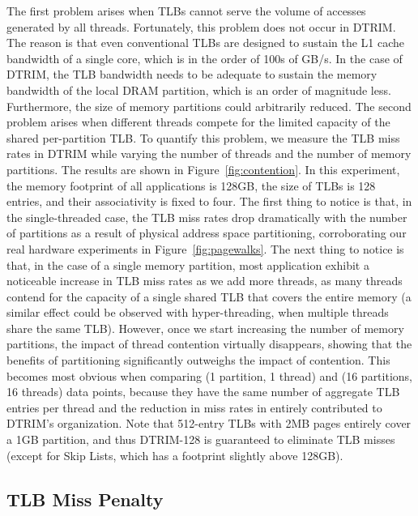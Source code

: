 The first problem arises when TLBs cannot serve the volume of accesses generated by all threads. Fortunately, this problem does not occur in DTRIM. The reason is that even conventional TLBs are designed to sustain the L1 cache bandwidth of a single core, which is in the order of 100s of GB/s. In the case of DTRIM, the TLB bandwidth needs to be adequate to sustain the memory bandwidth of the local DRAM partition, which is an order of magnitude less. Furthermore, the size of memory partitions could arbitrarily reduced. The second problem arises when different threads compete for the limited capacity of the shared per-partition TLB. To quantify this problem, we measure the TLB miss rates in DTRIM while varying the number of threads and the number of memory partitions. The results are shown in Figure~\ref{fig:contention}. In this experiment, the memory footprint of all applications is 128GB, the size of TLBs is 128 entries, and their associativity is fixed to four. The first thing to notice is that, in the single-threaded case, the TLB miss rates drop dramatically with the number of partitions as a result of physical address space partitioning, corroborating our real hardware experiments in Figure~\ref{fig:pagewalks}. The next thing to notice is that, in the case of a single memory partition, most application exhibit a noticeable increase in TLB miss rates as we add more threads, as many threads contend for the capacity of a single shared TLB that covers the entire memory (a similar effect could be observed with hyper-threading, when multiple threads share the same TLB). However, once we start increasing the number of memory partitions, the impact of thread contention virtually disappears, showing that the benefits of partitioning significantly outweighs the impact of contention. This becomes most obvious when comparing (1 partition, 1 thread) and (16 partitions, 16 threads) data  points, because they have the same number of aggregate TLB entries per thread and the reduction in miss rates in entirely contributed to DTRIM's organization. Note that 512-entry TLBs with 2MB pages entirely cover a 1GB partition, and thus DTRIM-128 is guaranteed to eliminate TLB misses (except for Skip Lists, which has a footprint slightly above 128GB). 

\subsection{TLB Miss Penalty}

